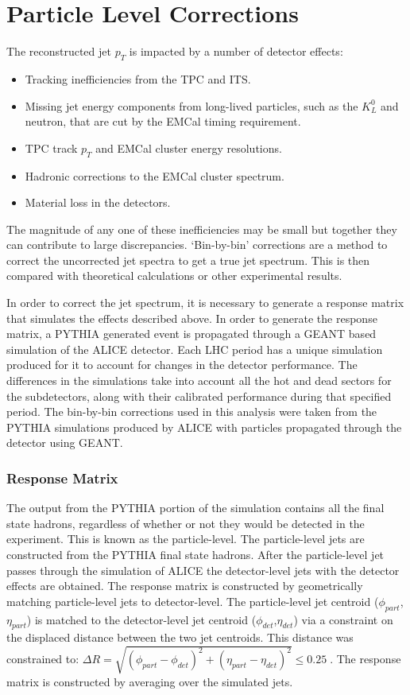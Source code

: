 \section{Particle Level Corrections}

The reconstructed jet $p_{T}$ is impacted by a number of detector effects:

\begin{itemize}
\item Tracking inefficiencies from the TPC and ITS.
\item Missing jet energy components from long-lived particles, such as the $K^{0}_{L}$ and neutron, that are cut by the EMCal timing requirement.
\item TPC track $p_{T}$ and EMCal cluster energy resolutions.
\item Hadronic corrections to the EMCal cluster spectrum.
\item Material loss in the detectors.
\end{itemize}

\noindent
The magnitude of any one of these inefficiencies may be small but together they can contribute to large discrepancies.  `Bin-by-bin' corrections are a method to correct the uncorrected jet spectra to get a true jet spectrum.  This is then compared with theoretical calculations or other experimental results.

In order to correct the jet spectrum, it is necessary to generate a response matrix that simulates the effects described above.  In order to generate the response matrix, a PYTHIA generated event is propagated through a GEANT based simulation of the ALICE detector.  Each LHC period has a unique simulation produced for it to account for changes in the detector performance.  The differences in the simulations take into account all the hot and dead sectors for the subdetectors, along with their calibrated performance during that specified period.  The bin-by-bin corrections used in this analysis were taken from the PYTHIA simulations produced by ALICE with particles propagated through the detector using GEANT.

\subsubsection{Response Matrix}
The output from the PYTHIA portion of the simulation contains all the final state hadrons, regardless of whether or not they would be detected in the experiment.  This is known as the particle-level.  The particle-level jets are constructed from the PYTHIA final state hadrons.  After the particle-level jet passes through the simulation of ALICE the detector-level jets with the detector effects are obtained.
The response matrix is constructed by geometrically matching particle-level jets to detector-level.  The particle-level jet centroid ($\phi_{part}$,$\eta_{part}$) is matched to the detector-level jet centroid ($\phi_{det}$,$\eta_{det}$) via a constraint on the displaced distance between the two jet centroids.  This distance was constrained to: $\Delta  R = \sqrt{(\phi_{part} - \phi_{det})^{2} + (\eta_{part} - \eta_{det})^{2}} \leq 0.25 \; $.  The response matrix is constructed by averaging over the simulated jets.

